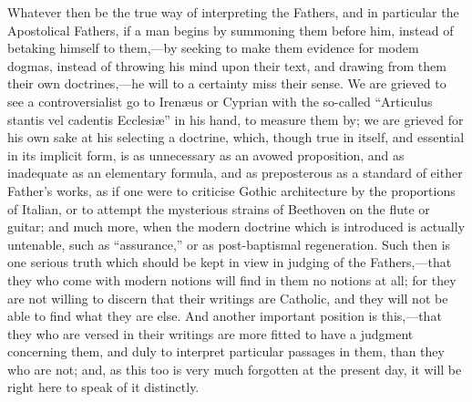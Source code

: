 Whatever then be the true way of interpreting the
Fathers, and in particular the Apostolical Fathers, if a man begins by
summoning them before him, instead of betaking himself to them,—by
seeking to make them evidence for modem dogmas, instead of throwing
his mind upon their text, and drawing from them their own
doctrines,—he will to a certainty miss their sense. We are grieved
to see a controversialist go to Irenæus or Cyprian with the so-called
``Articulus stantis vel cadentis Ecclesiæ'' in his hand, to measure
them by; we are grieved for his own sake at his selecting a doctrine,
which, though true in itself, and essential in its implicit form, is
as unnecessary as an avowed proposition, and as inadequate as an
elementary formula, and as preposterous as a standard of either Father's
works, as if one were to criticise Gothic architecture by the
proportions of Italian, or to attempt the mysterious strains of
Beethoven on the flute or guitar; and much more, when the modern
doctrine which is introduced is actually untenable, such as ``assurance,''
or as post-baptismal regeneration. Such then is one serious truth
which should be kept in view in judging of the Fathers,—that they
who come with modern notions will find in them no notions at all; for
they are not willing to discern that their writings are Catholic, and
they will not be able to find what they are else. And another
important position is this,—that they who are versed in their
writings are more fitted to have a judgment concerning them, and duly
to interpret particular passages in them, than they who are not; and,
as this too is very much forgotten at the present day, it will be
right here to speak of it distinctly.

